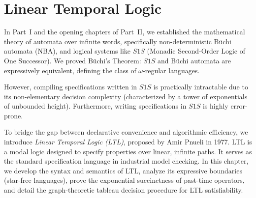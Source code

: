 
\chapter{Linear Temporal Logic}
\label{ch:ltl}

In Part~I and the opening chapters of Part~II, we established the mathematical theory of automata over infinite words, specifically non-deterministic B\"uchi automata (NBA), and logical systems like $S1S$ (Monadic Second-Order Logic of One Successor). We proved B\"uchi's Theorem: $S1S$ and B\"uchi automata are expressively equivalent, defining the class of $\omega$-regular languages. 

However, compiling specifications written in $S1S$ is practically intractable due to its non-elementary decision complexity (characterized by a tower of exponentials of unbounded height). Furthermore, writing specifications in $S1S$ is highly error-prone. 

To bridge the gap between declarative convenience and algorithmic efficiency, we introduce \emph{Linear Temporal Logic (LTL)}, proposed by Amir Pnueli in 1977. LTL is a modal logic designed to specify properties over linear, infinite paths. It serves as the standard specification language in industrial model checking. In this chapter, we develop the syntax and semantics of LTL, analyze its expressive boundaries (star-free languages), prove the exponential succinctness of past-time operators, and detail the graph-theoretic tableau decision procedure for LTL satisfiability.

